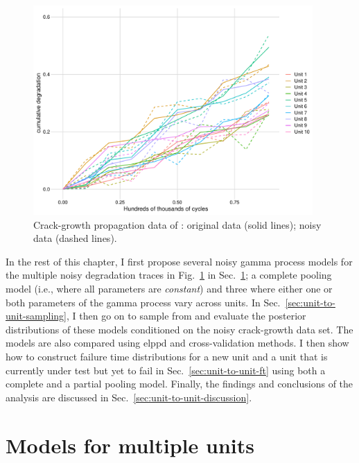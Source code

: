 \begin{figure}
   \centering
   \includegraphics[width=0.95\textwidth]{./figures/ch-5/noisy-crack-growth-data.pdf}
   \caption{Crack-growth propagation data of \citet{rodriguez-picon2018}: original data (solid lines); noisy data (dashed lines).}
   \label{fig:crack-growth-w-noise}
\end{figure}

In the rest of this chapter, I first propose several noisy gamma process models for the multiple noisy degradation traces in Fig.~\ref{fig:crack-growth-w-noise} in Sec.~\ref{sec:unit-to-unit-models}; a complete pooling model (i.e., where all parameters are \emph{constant}) and three where either one or both parameters of the gamma process vary across units. In Sec.~\ref{sec:unit-to-unit-sampling}, I then go on to sample from and evaluate the posterior distributions of these models conditioned on the noisy crack-growth data set. The models are also compared using $\mbox{elppd}$ and cross-validation methods. I then show how to construct failure time distributions for a new unit and a unit that is currently under test but yet to fail in Sec.~\ref{sec:unit-to-unit-ft} using both a complete and a partial pooling model. Finally, the findings and conclusions of the analysis are discussed in Sec.~\ref{sec:unit-to-unit-discussion}.

\section{Models for multiple units} \label{sec:unit-to-unit-models}

